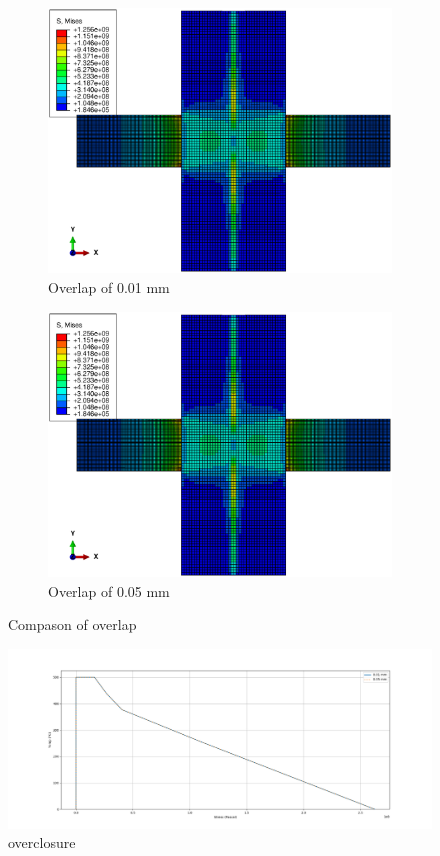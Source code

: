 \documentclass[12pt]{article}
\begin{document}
\begin{figure}[!htb]
  \centering
  \begin{subfigure}{.5\textwidth}
    \centering
    \includegraphics[width=0.95\linewidth]{pics/stress10}
    \caption{Overlap of 0.01 mm}
  \end{subfigure}%
  \begin{subfigure}{.5\textwidth}
    \centering
    \includegraphics[width=0.95\linewidth]{pics/stress50}
    \caption{Overlap of 0.05 mm}
   \end{subfigure}
  \caption{Compason of overlap}
\end{figure}




\begin{figure}[!htb]
  \centering
  \includegraphics[width=0.9\linewidth]{pics/result10and50}
 \caption{overclosure}
  \label{fig:1}
\end{figure}
\end{document}

